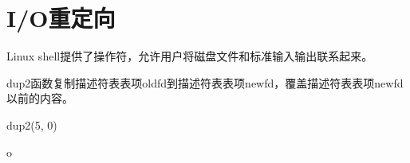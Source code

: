 
\section{I/O重定向}
{
    Linux shell提供了操作符，允许用户将磁盘文件和标准输入输出联系起来。

    dup2函数复制描述符表表项oldfd到描述符表表项newfd，覆盖描述符表表项newfd以前的内容。

    \begin{practicec}
        dup2(5, 0)
    \end{practicec}

    \begin{practicec}
        o
    \end{practicec}
}
